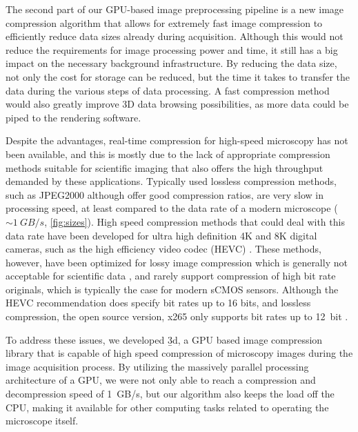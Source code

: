   The second part of our GPU-based image preprocessing pipeline is a new image compression algorithm that allows for extremely fast image compression to efficiently reduce data sizes already during acquisition.
  Although this would not reduce the requirements for image processing power and time, it still has a big impact on the necessary background infrastructure. By reducing the data size, not only the cost for storage can be reduced, but the time it takes to transfer the data during the various steps of data processing. A fast compression method would also greatly improve 3D data browsing possibilities, as more data could be piped to the rendering software.

  Despite the advantages, real-time compression for high-speed microscopy has not been available, and this is mostly due to the lack of appropriate compression methods suitable for scientific imaging that also offers the high throughput demanded by these applications. Typically used lossless compression methods, such as JPEG2000 \cite{adams_jpeg-2000_2001} although offer good compression ratios, are very slow in processing speed, at least compared to the data rate of a modern microscope ($\sim \SI{1}{GB/s}$, \autoref{fig:sizes}). High speed compression methods that could deal with this data rate have been developed for ultra high definition 4K and 8K digital cameras, such as the high efficiency video codec (HEVC) \cite{international_telecommunications_union_h.265_2016}. These methods, however, have been optimized for lossy image compression which is generally not acceptable for scientific data \cite{cromey_digital_2013}, and rarely support compression of high bit rate originals, which is typically the case for modern sCMOS sensors. Although the HEVC recommendation does specify bit rates up to 16 bits, and lossless compression, the open source version, x265 only supports bit rates up to \SI{12}{bit} \cite{noauthor_x265_nodate}.

  To address these issues, we developed \b3d, a GPU based image compression library that is capable of high speed compression of microscopy images during the image acquisition process. By utilizing the massively parallel processing architecture of a GPU, we were not only able to reach a compression and decompression speed of \SI{1}{GB/s}, but our algorithm also keeps the load off the CPU, making it available for other computing tasks related to operating the microscope itself.

